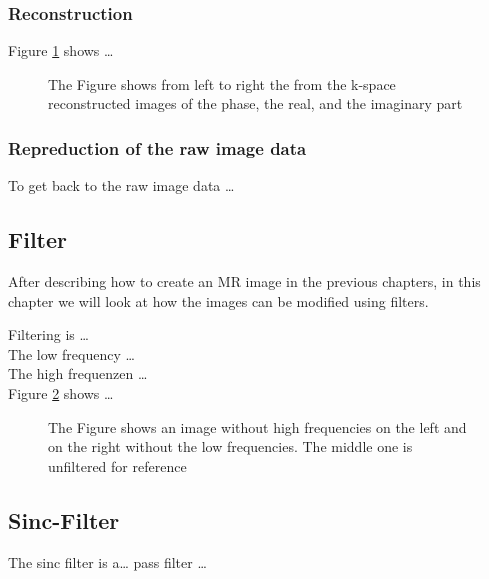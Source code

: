 \documentclass[%
	a4paper, %
	12pt, %
	english, %
	bibtotoc %
]{scrartcl}
\begin{document}
\subsubsection{Reconstruction}
Figure \ref{fig:mag_re_im} shows \dots

\begin{figure}
    \centering
    \vspace{5cm}
    \caption{The Figure shows from left to right the from the k-space reconstructed images of the phase, the real, and the imaginary part}
    \label{fig:mag_re_im}
\end{figure}

\subsubsection{Repreduction of the raw image data}
To get back to the raw image data \dots

\subsection{Filter}

After describing how to create an MR image in the previous chapters, in this chapter we will look at how the images can be modified using filters.

Filtering is \dots\\
The low frequency \dots\\
The high frequenzen \dots\\

Figure \ref{fig:filterung} shows \dots

\begin{figure}
    \centering
    \vspace{5cm}
    \caption{The Figure shows an image without high frequencies on the left and on the right without the low frequencies. The middle one is unfiltered for reference}
    \label{fig:filterung}
\end{figure}

\subsection{Sinc-Filter}
The sinc filter is a\dots %
pass filter \dots 
\end{document}

